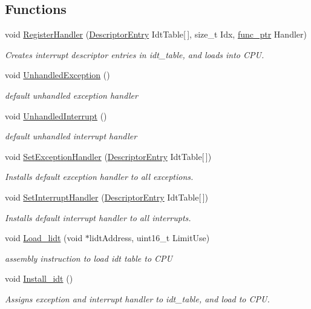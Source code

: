 \subsection*{Functions}
\begin{DoxyCompactItemize}
\item 
void \hyperlink{namespace_i_n_t_r_p_a91a6a2668bfa9961a9ed265f6ceac47d}{Register\+Handler} (\hyperlink{union_i_n_t_r_p_1_1_descriptor_entry}{Descriptor\+Entry} Idt\+Table\mbox{[}$\,$\mbox{]}, size\+\_\+t Idx, \hyperlink{ktypes_8h_a46bbb9e776183ed6a8eca9d919756434}{func\+\_\+ptr} Handler)
\begin{DoxyCompactList}\small\item\em Creates interrupt descriptor entries in idt\+\_\+table, and loads into C\+PU. \end{DoxyCompactList}\item 
void \hyperlink{namespace_i_n_t_r_p_a7732859732913734b09dd07030c41991}{Unhandled\+Exception} ()
\begin{DoxyCompactList}\small\item\em default unhandled exception handler \end{DoxyCompactList}\item 
void \hyperlink{namespace_i_n_t_r_p_a13c03019c9d7b305743516310096a82a}{Unhandled\+Interrupt} ()
\begin{DoxyCompactList}\small\item\em default unhandled interrupt handler \end{DoxyCompactList}\item 
void \hyperlink{namespace_i_n_t_r_p_a4a1a1ff73a4e9bb1c17daf205170daa9}{Set\+Exception\+Handler} (\hyperlink{union_i_n_t_r_p_1_1_descriptor_entry}{Descriptor\+Entry} Idt\+Table\mbox{[}$\,$\mbox{]})
\begin{DoxyCompactList}\small\item\em Installs default exception handler to all exceptions. \end{DoxyCompactList}\item 
void \hyperlink{namespace_i_n_t_r_p_abf09ee877603981fe255cd050cbbb110}{Set\+Interrupt\+Handler} (\hyperlink{union_i_n_t_r_p_1_1_descriptor_entry}{Descriptor\+Entry} Idt\+Table\mbox{[}$\,$\mbox{]})
\begin{DoxyCompactList}\small\item\em Installs default interrupt handler to all interrupts. \end{DoxyCompactList}\item 
void \hyperlink{namespace_i_n_t_r_p_a194f85d6c873615e9125466e3b23c30f}{Load\+\_\+lidt} (void $\ast$lidt\+Address, uint16\+\_\+t Limit\+Use)
\begin{DoxyCompactList}\small\item\em assembly instruction to load idt table to C\+PU \end{DoxyCompactList}\item 
void \hyperlink{namespace_i_n_t_r_p_a139b273cc1e45d3c2fdfe0d387a98518}{Install\+\_\+idt} ()
\begin{DoxyCompactList}\small\item\em Assigns exception and interrupt handler to idt\+\_\+table, and load to C\+PU. \end{DoxyCompactList}\end{DoxyCompactItemize}
